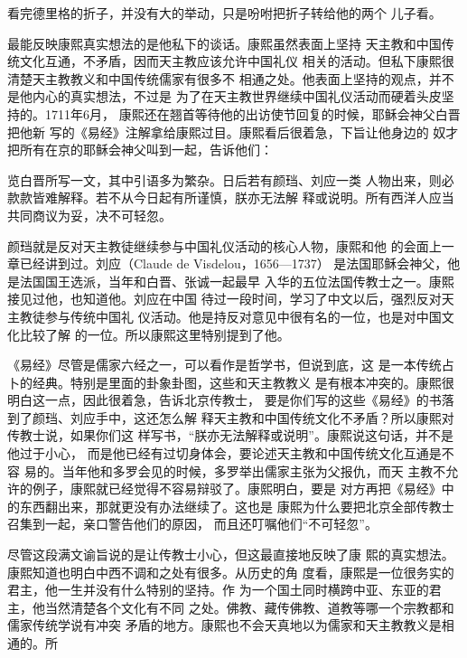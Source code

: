 看完德里格的折子，并没有大的举动，只是吩咐把折子转给他的两个%
儿子看。%
\par
最能反映康熙真实想法的是他私下的谈话。康熙虽然表面上坚持%
天主教和中国传统文化互通，不矛盾，因而天主教应该允许中国礼仪%
相关的活动。但私下康熙很清楚天主教教义和中国传统儒家有很多不%
相通之处。他表面上坚持的观点，并不是他内心的真实想法，不过是%
为了在天主教世界继续中国礼仪活动而硬着头皮坚持的。1711年6月，%
康熙还在翘首等待他的出访使节回复的时候，耶稣会神父白晋把他新%
写的《易经》注解拿给康熙过目。康熙看后很着急，下旨让他身边的%
奴才把所有在京的耶稣会神父叫到一起，告诉他们：%
\par
{\bookkai 览白晋所写一文，其中引语多为繁杂。日后若有颜珰、刘应一类}%
{\bookkai 人物出来，则必款款皆难解释。若不从今日起有所谨慎，朕亦无法解}%
{\bookkai 释或说明。所有西洋人应当共同商议为妥，决不可轻忽。}%
\par
颜珰就是反对天主教徒继续参与中国礼仪活动的核心人物，康熙和他%
的会面上一章已经讲到过。刘应（Claude de Visdelou，1656—1737）%
是法国耶稣会神父，他是法国国王选派，当年和白晋、张诚一起最早%
入华的五位法国传教士之一。康熙接见过他，也知道他。刘应在中国%
待过一段时间，学习了中文以后，强烈反对天主教徒参与传统中国礼%
仪活动。他是持反对意见中很有名的一位，也是对中国文化比较了解%
的一位。所以康熙这里特别提到了他。%
\par
《易经》尽管是儒家六经之一，可以看作是哲学书，但说到底，这%
是一本传统占卜的经典。特别是里面的卦象卦图，这些和天主教教义%
是有根本冲突的。康熙很明白这一点，因此很着急，告诉北京传教士，%
要是你们写的这些《易经》的书落到了颜珰、刘应手中，这还怎么解%
释天主教和中国传统文化不矛盾？所以康熙对传教士说，如果你们这%
样写书，“朕亦无法解释或说明”。康熙说这句话，并不是他过于小心，%
而是他已经有过切身体会，要论述天主教和中国传统文化互通是不容%
易的。当年他和多罗会见的时候，多罗举出儒家主张为父报仇，而天%
主教不允许的例子，康熙就已经觉得不容易辩驳了。康熙明白，要是%
对方再把《易经》中的东西翻出来，那就更没有办法继续了。这也是%
康熙为什么要把北京全部传教士召集到一起，亲口警告他们的原因，%
而且还叮嘱他们“不可轻忽”。%
\par
尽管这段满文谕旨说的是让传教士小心，但这最直接地反映了康%
熙的真实想法。康熙知道也明白中西不调和之处有很多。从历史的角%
度看，康熙是一位很务实的君主，他一生并没有什么特别的坚持。作%
为一个国土同时横跨中亚、东亚的君主，他当然清楚各个文化有不同%
之处。佛教、藏传佛教、道教等哪一个宗教都和儒家传统学说有冲突%
矛盾的地方。康熙也不会天真地以为儒家和天主教教义是相通的。所%
